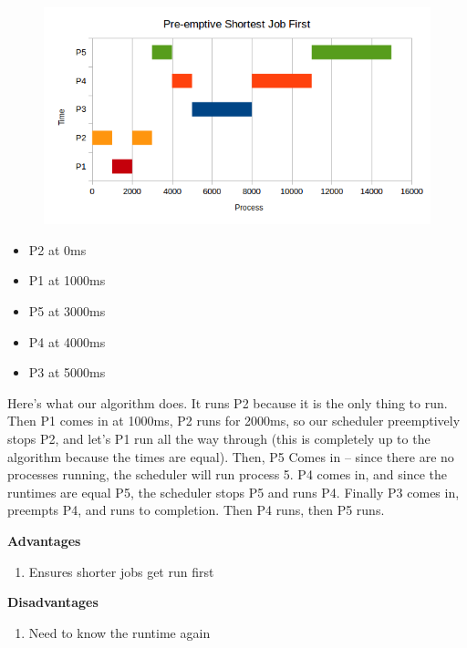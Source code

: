 \begin{figure}[htbp]
\centering
\includegraphics[width=\textwidth]{scheduling/images/psjf.png}
\caption{}
\end{figure}

\begin{itemize}
\tightlist
\item
  P2 at 0ms
\item
  P1 at 1000ms
\item
  P5 at 3000ms
\item
  P4 at 4000ms
\item
  P3 at 5000ms
\end{itemize}

Here's what our algorithm does. It runs P2 because it is the only thing to run. Then P1 comes in at 1000ms, P2 runs for 2000ms, so our scheduler preemptively stops P2, and let's P1 run all the way through (this is completely up to the algorithm because the times are equal). Then, P5 Comes in -- since there are no processes running, the scheduler will run process 5. P4 comes in, and since the runtimes are equal P5, the scheduler stops P5 and runs P4. Finally P3 comes in, preempts P4, and runs to completion. Then P4 runs, then P5 runs.

\textbf{Advantages} 

\begin{enumerate}
  \item Ensures shorter jobs get run first
\end{enumerate}

\textbf{Disadvantages} 

\begin{enumerate}
  \item Need to know the runtime again
\end{enumerate}

